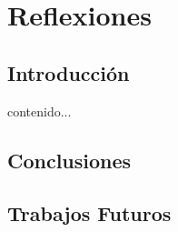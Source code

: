 \chapter{Reflexiones}
\section{Introducción}
contenido...
\newpage
\section{Conclusiones}
\newpage
\section{Trabajos Futuros}
\newpage
